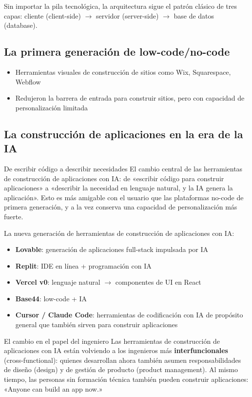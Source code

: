 \documentclass[a4paper]{article}
\begin{document}
Sin importar la pila tecnológica, la arquitectura sigue el patrón clásico de tres capas: cliente (client-side) $\rightarrow$ servidor (server-side) $\rightarrow$ base de datos (database).

\subsection{La primera generación de low-code/no-code}

\begin{itemize}
    \item Herramientas visuales de construcción de sitios como Wix, Squarespace, Webflow
    \item Redujeron la barrera de entrada para construir sitios, pero con capacidad de personalización limitada
\end{itemize}

\subsection{La construcción de aplicaciones en la era de la IA}

\begin{importantbox}{De escribir código a describir necesidades}
El cambio central de las herramientas de construcción de aplicaciones con IA: de «escribir código para construir aplicaciones» a «describir la necesidad en lenguaje natural, y la IA genera la aplicación». Esto es más amigable con el usuario que las plataformas no-code de primera generación, y a la vez conserva una capacidad de personalización más fuerte.
\end{importantbox}

La nueva generación de herramientas de construcción de aplicaciones con IA:
\begin{itemize}
    \item \textbf{Lovable}: generación de aplicaciones full-stack impulsada por IA
    \item \textbf{Replit}: IDE en línea + programación con IA
    \item \textbf{Vercel v0}: lenguaje natural $\rightarrow$ componentes de UI en React
    \item \textbf{Base44}: low-code + IA
    \item \textbf{Cursor / Claude Code}: herramientas de codificación con IA de propósito general que también sirven para construir aplicaciones
\end{itemize}

\begin{knowledgebox}{El cambio en el papel del ingeniero}
Las herramientas de construcción de aplicaciones con IA están volviendo a los ingenieros más \textbf{interfuncionales} (cross-functional): quienes desarrollan ahora también asumen responsabilidades de diseño (design) y de gestión de producto (product management). Al mismo tiempo, las personas sin formación técnica también pueden construir aplicaciones: «Anyone can build an app now.»
\end{knowledgebox}
\end{document}
